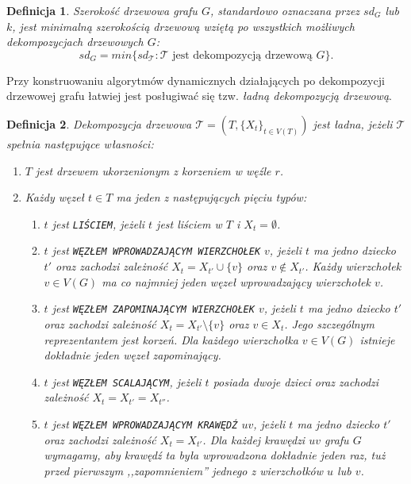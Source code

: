 \documentclass[12pt, oneside]{report}
\newtheorem{definition}{Definicja}
\begin{document}
\begin{definition}
\em \emph{Szerokość drzewowa grafu $G$}, standardowo oznaczana przez $sd_G$ lub $k$, jest minimalną szerokością drzewową wziętą po wszystkich możliwych dekompozycjach drzewowych $G$: $$sd_G = min \{sd_\mathcal{T}: \mathcal{T} \text{ jest dekompozycją drzewową }G\}.$$
\end{definition}

Przy konstruowaniu algorytmów dynamicznych działających po dekompozycji drzewowej grafu łatwiej jest posługiwać się tzw. \emph{ładną dekompozycją drzewową}.

\begin{definition}
\em Dekompozycja drzewowa $\mathcal{T} = (T, \{X_t\}_{t \in V(T)})$ jest \emph{ładna}, jeżeli $\mathcal{T}$ spełnia następujące własności:
\begin{enumerate}[label=(\roman*)]
	\item{$T$ jest drzewem ukorzenionym z korzeniem w węźle $r$.}
	\item{Każdy węzeł $t \in T$ ma jeden z następujących pięciu typów:}
	\begin{enumerate}[label=\arabic*)]
		\item{$t$ jest \texttt{LIŚCIEM}, jeżeli $t$ jest liściem w $T$ i $X_t = \emptyset$.}
		\item{$t$ jest \texttt{WĘZŁEM WPROWADZAJĄCYM WIERZCHOŁEK} $v$, jeżeli $t$ ma jedno dziecko $t'$ oraz zachodzi zależność $X_t = X_{t'} \cup \{v\}$ oraz $v \notin X_{t'}$. Każdy wierzchołek $v \in V(G)$ ma co najmniej jeden węzeł wprowadzający wierzchołek $v$.}
		\item{$t$ jest \texttt{WĘZŁEM ZAPOMINAJĄCYM WIERZCHOŁEK} $v$, jeżeli $t$ ma jedno dziecko $t'$ oraz zachodzi zależność $X_t = X_{t'} \setminus \{v\}$ oraz $v \in X_t$. Jego szczególnym reprezentantem jest korzeń. Dla każdego wierzchołka $v \in V(G)$ istnieje dokładnie jeden węzeł zapominający.}
		\item{$t$ jest \texttt{WĘZŁEM SCALAJĄCYM}, jeżeli $t$ posiada dwoje dzieci oraz zachodzi zależność $X_t = X_{t'} = X_{t''}$.}
		\item{$t$ jest \texttt{WĘZŁEM WPROWADZAJĄCYM KRAWĘDŹ} $uv$, jeżeli $t$ ma jedno dziecko $t'$ oraz zachodzi zależność $X_t = X_{t'}$. Dla każdej krawędzi $uv$ grafu $G$ wymagamy, aby krawędź ta była wprowadzona dokładnie jeden raz, tuż przed pierwszym ,,zapomnieniem'' jednego z wierzchołków $u$ lub $v$.}
\end{enumerate}
\end{enumerate}
\end{definition}
\end{document}
